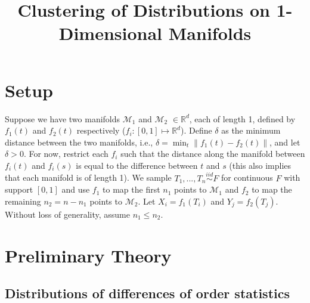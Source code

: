 \documentclass[
  11pt,
]{article}
\title{Clustering of Distributions on 1-Dimensional Manifolds}
\author{}
\date{\vspace{-2.5em}}
\begin{document}
\maketitle

\newcommand{\diag}{\mathrm{diag}}
\newcommand{\tr}{\mathrm{Tr}}
\newcommand{\blockdiag}{\mathrm{blockdiag}}
\newcommand{\indep}{\stackrel{\mathrm{ind}}{\sim}}
\newcommand{\iid}{\stackrel{\mathrm{iid}}{\sim}}
\newcommand{\Bernoulli}{\mathrm{Bernoulli}}
\newcommand{\Betadist}{\mathrm{Beta}}
\newcommand{\Uniform}{\mathrm{Uniform}}
\newcommand{\BG}{\mathrm{BernoulliGraph}}
\newcommand{\Categorical}{\mathrm{Categorical}}
\newtheorem{definition}{Definition}
\newtheorem{theorem}{Theorem}
\newtheorem{lemma}{Lemma}
\theoremstyle{remark}
\newtheorem*{remark}{Remark}
\theoremstyle{example}
\newtheorem*{example}{Example}
\newcommand{\dd}{\mathrm{d}}
\newcommand{\as}{\stackrel{\mathrm{a.s.}}{\to}}

\hypertarget{setup}{%
\section{Setup}\label{setup}}

Suppose we have two manifolds \(\mathcal{M}_1\) and \(\mathcal{M}_2\)
\(\in \mathbb{R}^d\), each of length 1, defined by \(f_1(t)\) and
\(f_2(t)\) respectively (\(f_i : [0, 1] \mapsto \mathbb{R}^d\)). Define
\(\delta\) as the minimum distance between the two manifolds, i.e.,
\(\delta = \min_t \|f_1(t) - f_2(t)\|\), and let \(\delta > 0\). For
now, restrict each \(f_i\) such that the distance along the manifold
between \(f_i(t)\) and \(f_i(s)\) is equal to the difference between
\(t\) and \(s\) (this also implies that each manifold is of length 1).
We sample \(T_1, ..., T_n \stackrel{iid}{\sim} F\) for continuous \(F\)
with support \([0, 1]\) and use \(f_1\) to map the first \(n_1\) points
to \(\mathcal{M}_1\) and \(f_2\) to map the remaining \(n_2 = n - n_1\)
points to \(\mathcal{M}_2\). Let \(X_i = f_1(T_i)\) and
\(Y_j = f_2(T_j)\). Without loss of generality, assume \(n_1 \leq n_2\).

\hypertarget{preliminary-theory}{%
\section{Preliminary Theory}\label{preliminary-theory}}

\hypertarget{distributions-of-differences-of-order-statistics}{%
\subsection{Distributions of differences of order
statistics}\label{distributions-of-differences-of-order-statistics}}
\end{document}
